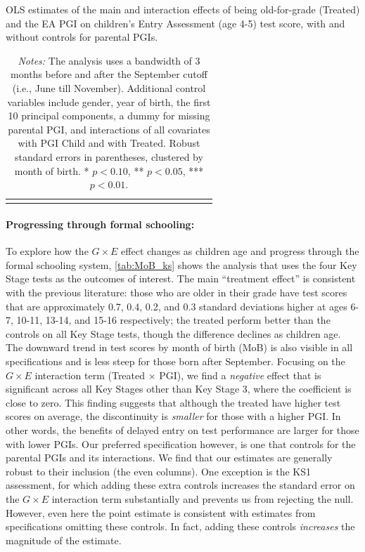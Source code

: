 \documentclass[12pt,a4paper]{article}
\begin{document}
\begin{bibunit}
\begin{table}[H]
\caption{OLS estimates of the main and interaction effects of being old-for-grade (Treated) and the EA PGI on children's Entry Assessment (age 4-5) test score, with and without controls for parental PGIs.}
\centering
{\scriptsize
\begin{tabular}{lcccccccccccccccccccc}
\toprule 

\bottomrule
\addlinespace[.75ex]
\end{tabular}
\label{tab:MoB_ea}
}
\caption*{\footnotesize \noindent \textit{Notes:} The analysis uses a bandwidth of 3 months before and after the September cutoff (i.e., June till November). Additional control variables include gender, year of birth, the first 10 principal components, a dummy for missing parental PGI, and interactions of all covariates with PGI Child and with Treated. Robust standard errors in parentheses, clustered by month of birth. * $p < 0.10$, ** $p < 0.05$, *** $p < 0.01$.}
\end{table}

\paragraph{Progressing through formal schooling:}
To explore how the $G \times E$ effect changes as children age and progress through the formal schooling system, \autoref{tab:MoB_ks} shows the analysis that uses the four Key Stage tests as the outcomes of interest.  
The main ``treatment effect'' is consistent with the previous literature: those who are older in their grade have test scores that are approximately 0.7, 0.4, 0.2, and 0.3 standard deviations higher at ages 6-7, 10-11, 13-14, and 15-16 respectively; the treated perform better than the controls on all Key Stage tests, though the difference declines as children age. The downward trend in test scores by month of birth (MoB) is also visible in all specifications and is less steep for those born after September. Focusing on the $G \times E$ interaction term (Treated $\times$ PGI), we find a \textit{negative} effect that is significant across all Key Stages other than Key Stage 3, where the coefficient is close to zero. This finding suggests that although the treated have higher test scores on average, the discontinuity is \textit{smaller} for those with a higher PGI. In other words, the benefits of delayed entry on test performance are larger for those with lower PGIs.  Our preferred specification however, is one that controls for the parental PGIs and its interactions. We find that our estimates are generally robust to their inclusion (the even columns). One exception is the KS1 assessment, for which adding these extra controls increases the standard error on the $G \times E$ interaction term substantially and prevents us from rejecting the null.  However, even here the point estimate is consistent with estimates from specifications omitting these controls. In fact, adding these controls \textit{increases} the magnitude of the estimate.


\end{bibunit}
\end{document}
